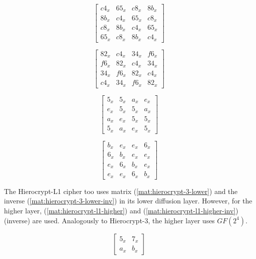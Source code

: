\documentclass{report}
\begin{document}
\begin{equation}\label{mat:hierocrypt-3-lower}
\begin{bmatrix}
c4_x & 65_x & c8_x & 8b_x\\
8b_x & c4_x & 65_x & c8_x\\
c8_x & 8b_x & c4_x & 65_x\\
65_x & c8_x & 8b_x & c4_x
\end{bmatrix}
\end{equation}

\begin{equation}\label{mat:hierocrypt-3-lower-inv}
\begin{bmatrix}
82_x & c4_x & 34_x & f6_x\\
f6_x & 82_x & c4_x & 34_x\\
34_x & f6_x & 82_x & c4_x\\
c4_x & 34_x & f6_x & 82_x
\end{bmatrix}
\end{equation}

\begin{equation}\label{mat:hierocrypt-3-higher}
\begin{bmatrix}
5_x & 5_x & a_x & e_x\\
e_x & 5_x & 5_x & a_x\\
a_x & e_x & 5_x & 5_x\\
5_x & a_x & e_x & 5_x
\end{bmatrix}
\end{equation}

\begin{equation}\label{mat:hierocrypt-3-higher-inv}
\begin{bmatrix}
b_x & e_x & e_x & 6_x\\
6_x & b_x & e_x & e_x\\
e_x & 6_x & b_x & e_x\\
e_x & e_x & 6_x & b_x
\end{bmatrix}
\end{equation}

The Hierocrypt-L1 cipher too uses matrix (\ref{mat:hierocrypt-3-lower}) and the inverse (\ref{mat:hierocrypt-3-lower-inv}) in its lower diffusion layer. However, for the higher layer, (\ref{mat:hierocrypt-l1-higher}) and (\ref{mat:hierocrypt-l1-higher-inv}) (inverse) are used. Analogously to Hierocrypt-3, the higher layer uses $GF(2^4)$.

\begin{equation}\label{mat:hierocrypt-l1-higher}
\begin{bmatrix}
5_x & 7_x\\
a_x & b_x
\end{bmatrix}
\end{equation}
\end{document}
